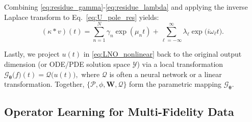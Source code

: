 Combining \eqref{eq:residue_gamma}-\eqref{eq:residue_lambda} and applying the inverse Laplace transform to Eq.~\eqref{eq:U_pole_res} yields:
\begin{equation}\label{eq:u_time_domain}
(\kappa * v)(t)
 = 
\sum_{n=1}^N
\gamma_n \exp(\mu_n t)
 + 
\sum_{\ell=-\infty}^{\infty}
\lambda_\ell 
\exp \bigl(i\omega_\ell t\bigr).
\end{equation}

Lastly, we project $u(t)$ in \eqref{eq:LNO_nonlinear} back to the original output dimension (or ODE/PDE solution space $\mathcal{Y}$) via a local transformation $
\mathcal{G}_{\boldsymbol{\theta}} \bigl(f\bigr)(t)
 = 
\mathcal{Q}\bigl(u(t)\bigr),
$ where $\mathcal{Q}$ is often a neural network or a linear transformation. Together, $\{\mathcal{P},\phi,\mathbf{W},\mathcal{Q}\}$ form the parametric mapping $\mathcal{G}_{\boldsymbol{\theta}}$.



\subsection{Operator Learning for Multi-Fidelity Data}\label{subsec:multi_fid_model}

